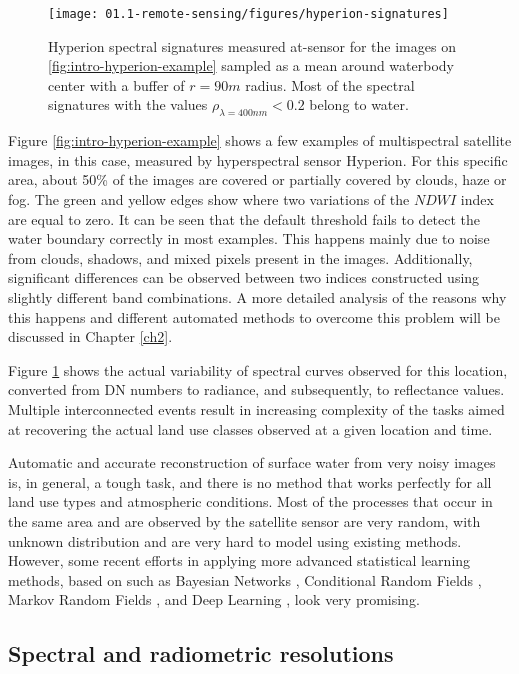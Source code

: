 \begin{figure}
	\texttt{[image: 01.1-remote-sensing/figures/hyperion-signatures]}
	\caption{Hyperion spectral signatures measured at-sensor for the images on \ref{fig:intro-hyperion-example} sampled as a mean around waterbody center with a buffer of $r=90m$ radius. Most of the spectral signatures with the values $\rho_{\lambda = 400nm} < 0.2$ belong to water.} 
	\label{fig:intro-hyperion-example-signatures}
\end{figure}

Figure \ref{fig:intro-hyperion-example} shows a few examples of multispectral satellite images, in this case, measured by hyperspectral sensor Hyperion. For this specific area, about 50\% of the images are covered or partially covered by clouds, haze or fog. The green and yellow edges show where two variations of the $NDWI$ index are equal to zero. It can be seen that the default threshold fails to detect the water boundary correctly in most examples. This happens mainly due to noise from clouds, shadows, and mixed pixels present in the images. Additionally, significant differences can be observed between two indices constructed using slightly different band combinations. A more detailed analysis of the reasons why this happens and different automated methods to overcome this problem will be discussed in Chapter \ref{ch2}.

Figure \ref{fig:intro-hyperion-example-signatures} shows the actual variability of spectral curves observed for this location, converted from DN numbers to radiance, and subsequently, to reflectance values. Multiple interconnected events result in increasing complexity of the tasks aimed at recovering the actual land use classes observed at a given location and time.

Automatic and accurate reconstruction of surface water from very noisy images is, in general, a tough task, and there is no method that works perfectly for all land use types and atmospheric conditions. Most of the processes that occur in the same area and are observed by the satellite sensor are very random, with unknown distribution and are very hard to model using existing methods. However, some recent efforts in applying more advanced statistical learning methods, based on such as Bayesian Networks \citep{mello2013bayesian}, Conditional Random Fields \citep{hoberg2015conditional}, Markov Random Fields \citep{elmi2016dynamic}, and Deep Learning \citep{chen2014deep}, look very promising.

\subsection{Spectral and radiometric resolutions}

